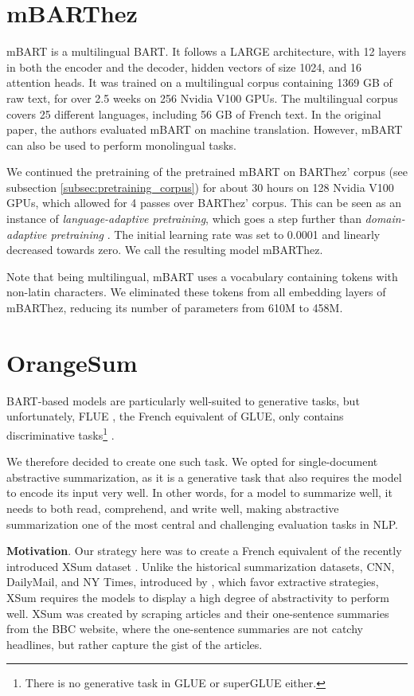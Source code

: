 \documentclass[11pt,a4paper]{article}
\begin{document}
\section{mBARThez}\label{sec:mbarthez}
mBART \cite{liu2020multilingual} is a multilingual BART.
It follows a LARGE architecture, with 12 layers in both the encoder and the decoder, hidden vectors of size 1024, and 16 attention heads.
It was trained on a multilingual corpus containing 1369 GB of raw text, for over 2.5 weeks on 256 Nvidia V100 GPUs.
The multilingual corpus covers 25 different languages, including 56 GB of French text.
In the original paper, the authors evaluated mBART on machine translation.
However, mBART can also be used to perform monolingual tasks.

We continued the pretraining of the pretrained mBART on BARThez' corpus (see subsection \ref{subsec:pretraining_corpus}) for about 30 hours on 128 Nvidia V100 GPUs, which allowed for 4 passes over BARThez' corpus.
This can be seen as an instance of \textit{language-adaptive pretraining}, which goes a step further than \textit{domain-adaptive pretraining} \cite{gururangan2020don}.
The initial learning rate was set to 0.0001 and linearly decreased towards zero.
We call the resulting model mBARThez.

Note that being multilingual, mBART uses a vocabulary containing tokens with non-latin characters.
We eliminated these tokens from all embedding layers of mBARThez, reducing its number of parameters from 610M to 458M.

\section{OrangeSum}
BART-based models are particularly well-suited to generative tasks, but unfortunately, FLUE \cite{le2019flaubert}, the French equivalent of GLUE, only contains discriminative tasks\footnote{There is no generative task in GLUE or superGLUE \cite{wang2019superglue} either.} \cite{wang2018glue}.

We therefore decided to create one such task.
We opted for single-document abstractive summarization, as it is a generative task that also requires the model to encode its input very well.
In other words, for a model to summarize well, it needs to both read, comprehend, and write well, making abstractive summarization one of the most central and challenging evaluation tasks in NLP.

\noindent \textbf{Motivation}. Our strategy here was to create a French equivalent of the recently introduced XSum dataset \cite{narayan2018don}.
Unlike the historical summarization datasets, CNN, DailyMail, and NY Times, introduced by \citet{hermann2015teaching}, which favor extractive strategies, XSum requires the models to display a high degree of abstractivity to perform well.
XSum was created by scraping articles and their one-sentence summaries from the BBC website, where the one-sentence summaries are not catchy headlines, but rather capture the gist of the articles.
\end{document}
